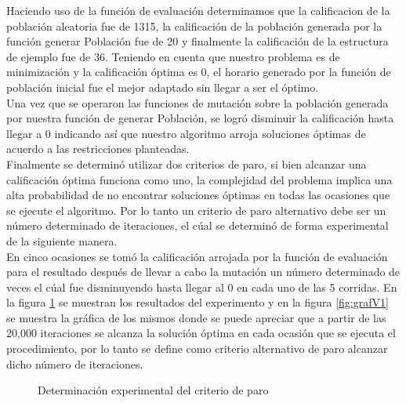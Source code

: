 Haciendo uso de la función de evaluación determinamos que la calificacion de la población aleatoria fue de 1315, la calificación de la población generada por la función generar Población fue de 20 y finalmente la calificación de la estructura de ejemplo fue de 36. Teniendo en cuenta que nuestro problema es de minimización y la calificación óptima es 0, el horario generado por la función de población inicial fue el mejor adaptado sin llegar a ser el óptimo.\\

Una vez que se operaron las funciones de mutación sobre la población generada por nuestra función de generar Población, se logró disminuir la calificación hasta llegar a 0 indicando así que nuestro algoritmo arroja soluciones óptimas de acuerdo a las restricciones planteadas.\\

Finalmente se determinó utilizar dos criterios de paro, si bien alcanzar una calificación óptima funciona como uno, la complejidad del problema implica una alta probabilidad de no encontrar soluciones óptimas en todas las ocasiones que se ejecute el algoritmo. Por lo tanto un criterio de paro alternativo debe ser un número determinado de iteraciones, el cúal se determinó de forma experimental de la siguiente manera.\\

En cinco ocasiones se tomó la calificación arrojada por la función de evaluación para el resultado después de llevar a cabo la mutación un número determinado de veces el cúal fue disminuyendo hasta llegar al 0 en cada uno de las 5 corridas. En la figura \ref{fig:PruebaV2} se muestran los resultados del experimento y en la figura \ref{fig:grafV1} se muestra la gráfica de los mismos donde se puede apreciar que a partir de las 20,000 iteraciones se alcanza la solución óptima en cada ocasión que se ejecuta el procedimiento, por lo tanto se define como criterio alternativo de paro alcanzar dicho número de iteraciones.\\
 
 \begin{figure}[htbp!]
 	\begin{center}
 		\caption{Determinación experimental del criterio de paro}
 		\label{fig:PruebaV2}
 	\end{center}
 \end{figure}


